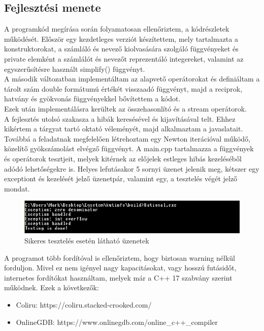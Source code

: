\documentclass[a4paper, 12pt]{article}
\begin{document}
\subsection*{Fejlesztési menete}
\indent A programkód megírása során folyamatosan ellenőriztem, a kódrészletek működését.
Először egy kezdetleges verziót készítettem, mely tartalmazta a konstruktorokat, a számláló és nevező kiolvasására szolgáló függvényeket és private elemként a számlálót és nevezőt reprezentáló integereket, valamint az egyszerűsítésre használt simplify() függvényt. 
\\
\indent A második változatban implementáltam az alapvető operátorokat és definiáltam a tárolt szám double formátumú értékét visszaadó függvényt, majd a reciprok, hatvány és gyökvonás függvényekkel bővítettem a kódot.
\\
 Ezek után implementálásra kerültek az összehasonlító és a stream operátorok.
\\
\indent A fejlesztés utolsó szakasza a hibák keresésével és kijavításával telt. Ehhez kikértem a tárgyat tartó oktató véleményét, majd alkalmaztam a javaslatait. Továbbá a feladatnak megfelelően létrehoztam egy Newton iterációval működő, közelítő gyökszámolást elvégző függvényt. A main.cpp tartalmazza a függvények és operátorok tesztjeit, melyek kitérnek az előjelek estleges hibás kezeléséből adódó lehetőségekre is.
Helyes lefutásakor 5 sornyi üzenet jelenik meg, kétszer egy exceptiont és kezelését jelző üzenetpár, valamint egy, a tesztelés végét 
jelző mondat.
\begin{figure}[h!]
\includegraphics[width=1\textwidth]{succesful.eps}
\caption{Sikeres tesztelés esetén látható üzenetek}
\end{figure}

A programot több fordítóval is ellenőriztem, hogy biztosan warning nélkül forduljon. Mivel ez nem igényel nagy kapacitásokat, vagy hosszú futásidőt, internetes fordítókat használtam, melyek már a C++ 17 szabvány szerint működnek.
Ezek a következők:
\begin{itemize}
	\item Coliru: https://coliru.stacked-crooked.com/
	\item OnlineGDB: https://www.onlinegdb.com/online\_c++\_compiler
\end{itemize}
\end{document}
